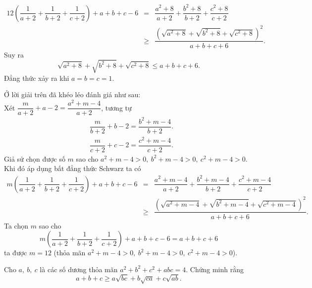 {\begin{bt}
{\begin{eqnarray*}
			12\left(\dfrac{1}{a+2}+\dfrac{1}{b+2}+\dfrac{1}{c+2}\right)+a+b+c-6&=&\dfrac{a^{2}+8}{a+2}+\dfrac{b^{2}+8}{b+2}+\dfrac{c^{2}+8}{c+2}\\
			&\geq&\dfrac{\left(\sqrt{a^{2}+8}+\sqrt{b^{2}+8}+\sqrt{c^{2}+8}\right)^{2}}{a+b+c+6}.
		\end{eqnarray*}
		Suy ra 
		\[ 
		\sqrt{a^{2}+8}+\sqrt{b^{2}+8}+\sqrt{c^{2}+8}\leq a+b+c+6.
		\]
		Đẳng thức xảy ra khi $ a=b=c=1 $.
	}
	\begin{nx}
		Ở lời giải trên đã khéo léo đánh giá như sau:\\
		Xét $ \dfrac{m}{a+2}+a-2=\dfrac{a^{2}+m-4}{a+2} $, tương tự
		\begin{align*}
		&\dfrac{m}{b+2}+b-2=\dfrac{b^{2}+m-4}{b+2}.\\
		&\dfrac{m}{c+2}+c-2=\dfrac{c^{2}+m-4}{c+2}.
		\end{align*}
		Giả sử chọn được số $ m $ sao cho $ a^{2}+m-4>0,\ b^{2}+m-4>0,\ c^{2}+m-4>0 $. Khi đó áp dụng bất đẳng thức Schwarz ta có
		\begin{eqnarray*}
			m\left(\dfrac{1}{a+2}+\dfrac{1}{b+2}+\dfrac{1}{c+2}\right)+a+b+c-6&=&\dfrac{a^{2}+m-4}{a+2}+\dfrac{b^{2}+m-4}{b+2}+\dfrac{c^{2}+m-4}{c+2}\\
			&\geq&\dfrac{\left(\sqrt{a^{2}+m-4}+\sqrt{b^{2}+m-4}+\sqrt{c^{2}+m-4}\right)^{2}}{a+b+c+6}.
		\end{eqnarray*}
		Ta chọn $ m $ sao cho 
		\[ 
		m\left(\dfrac{1}{a+2}+\dfrac{1}{b+2}+\dfrac{1}{c+2}\right)+a+b+c-6=a+b+c+6
		\]
		ta được $ m=12 $ (thỏa mãn $ a^{2}+m-4>0,\ b^{2}+m-4>0,\ c^{2}+m-4>0 $).
	\end{nx}
\end{bt}
\begin{bt}%
	Cho $ a,\ b,\ c $ là các số dương thỏa mãn $ a^{2}+b^{2}+c^{2}+abc=4 $. Chứng minh rằng
	\[ 
	a+b+c\geq a\sqrt{bc}+b\sqrt{ca}+c\sqrt{ab}.
	\]
\end{bt}}
